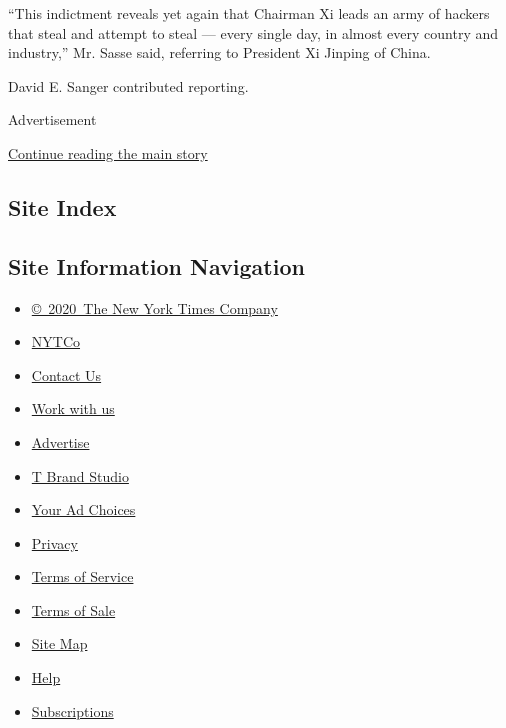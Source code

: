 ``This indictment reveals yet again that Chairman Xi leads an army of
hackers that steal and attempt to steal --- every single day, in almost
every country and industry,'' Mr. Sasse said, referring to President Xi
Jinping of China.

David E. Sanger contributed reporting.

Advertisement

\protect\hyperlink{after-bottom}{Continue reading the main story}

\hypertarget{site-index}{%
\subsection{Site Index}\label{site-index}}

\hypertarget{site-information-navigation}{%
\subsection{Site Information
Navigation}\label{site-information-navigation}}

\begin{itemize}
\tightlist
\item
  \href{https://help.nytimes.com/hc/en-us/articles/115014792127-Copyright-notice}{©~2020~The
  New York Times Company}
\end{itemize}

\begin{itemize}
\tightlist
\item
  \href{https://www.nytco.com/}{NYTCo}
\item
  \href{https://help.nytimes.com/hc/en-us/articles/115015385887-Contact-Us}{Contact
  Us}
\item
  \href{https://www.nytco.com/careers/}{Work with us}
\item
  \href{https://nytmediakit.com/}{Advertise}
\item
  \href{http://www.tbrandstudio.com/}{T Brand Studio}
\item
  \href{https://www.nytimes.com/privacy/cookie-policy\#how-do-i-manage-trackers}{Your
  Ad Choices}
\item
  \href{https://www.nytimes.com/privacy}{Privacy}
\item
  \href{https://help.nytimes.com/hc/en-us/articles/115014893428-Terms-of-service}{Terms
  of Service}
\item
  \href{https://help.nytimes.com/hc/en-us/articles/115014893968-Terms-of-sale}{Terms
  of Sale}
\item
  \href{https://spiderbites.nytimes.com}{Site Map}
\item
  \href{https://help.nytimes.com/hc/en-us}{Help}
\item
  \href{https://www.nytimes.com/subscription?campaignId=37WXW}{Subscriptions}
\end{itemize}
